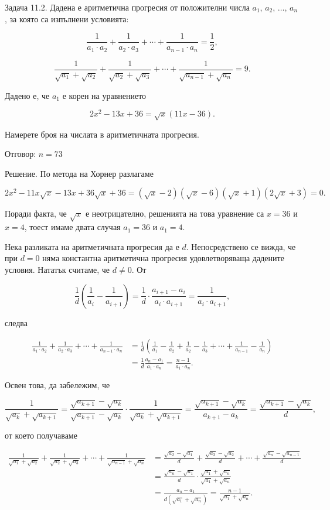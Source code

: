 Задача 11.2. Дадена е аритметична прогресия от положителни числа $a_1$, $a_2$, $\ldots$, $a_n$, за която са изпълнени условията:

$$\frac{1}{a_1\cdot a_2}+\frac{1}{a_2\cdot a_3}+\cdots+\frac{1}{a_{n-1}\cdot a_n}=\frac12,$$

$$\frac{1}{\sqrt{a_1}+\sqrt{a_2}}+\frac{1}{\sqrt{a_2}+\sqrt{a_3}}+\cdots+\frac{1}{\sqrt{a_{n-1}}+\sqrt{a_n}}=9.$$

Дадено е, че $a_1$ е корен на уравнението

$$2x^2-13x+36=\sqrt{x}(11x-36).$$

Намерете броя на числата в аритметичната прогресия.

Отговор: $n=73$

Решение. По метода на Хорнер разлагаме

$$2x^2-11x\sqrt{x}-13x+36\sqrt{x}+36=(\sqrt{x}-2)(\sqrt{x}-6)(\sqrt{x}+1)(2\sqrt{x}+3)=0.$$

Поради факта, че $\sqrt{x}$ е неотрицателно, решенията на това уравнение са $x=36$ и $x=4$, тоест имаме двата случая $a_1=36$ и $a_1=4$.

Нека разликата на аритметичната прогресия да е $d$. Непосредствено се вижда, че при $d=0$ няма константна аритметична прогресия удовлетворяваща дадените условия. Нататък считаме, че $d\ne0$. От

$$\frac1d\left(\frac1{a_i}-\frac1{a_{i+1}}\right)=\frac1d\cdot\frac{a_{i+1}-a_i}{a_i\cdot a_{i+1}}=\frac1{a_i\cdot a_{i+1}},$$

следва

$$\begin{aligned}
\frac{1}{a_1\cdot a_2}+\frac{1}{a_2\cdot a_3}+\cdots+\frac{1}{a_{n-1}\cdot a_n}
&=\frac1d\left(\frac1{a_1}-\frac1{a_2}+\frac1{a_2}-\frac1{a_3}+\cdots+\frac1{a_{n-1}}-\frac1{a_n}\right)\\
&=\frac1d\frac{a_n-a_1}{a_1\cdot a_n}=\frac{n-1}{a_1\cdot a_n}.
\end{aligned}$$

Освен това, да забележим, че

$$\frac1{\sqrt{a_k}+\sqrt{a_{k+1}}}=\frac{\sqrt{a_{k+1}}-\sqrt{a_k}}{\sqrt{a_{k+1}}-\sqrt{a_k}}\cdot\frac1{\sqrt{a_k}+\sqrt{a_{k+1}}}=\frac{\sqrt{a_{k+1}}-\sqrt{a_k}}{a_{k+1}-a_k}=\frac{\sqrt{a_{k+1}}-\sqrt{a_k}}d,$$

от което получаваме

$$\begin{aligned}
\frac1{\sqrt{a_1}+\sqrt{a_2}}+\frac1{\sqrt{a_2}+\sqrt{a_3}}+\cdots+\frac1{\sqrt{a_{n-1}}+\sqrt{a_n}}
&=\frac{\sqrt{a_2}-\sqrt{a_1}}d+\frac{\sqrt{a_3}-\sqrt{a_2}}d+\cdots+\frac{\sqrt{a_n}-\sqrt{a_{n-1}}}d\\
&=\frac{\sqrt{a_n}-\sqrt{a_1}}d\cdot\frac{\sqrt{a_1}+\sqrt{a_n}}{\sqrt{a_1}+\sqrt{a_n}}\\
&=\frac{a_n-a_1}{d(\sqrt{a_1}+\sqrt{a_n})}=\frac{n-1}{\sqrt{a_1}+\sqrt{a_n}}.
\end{aligned}$$

